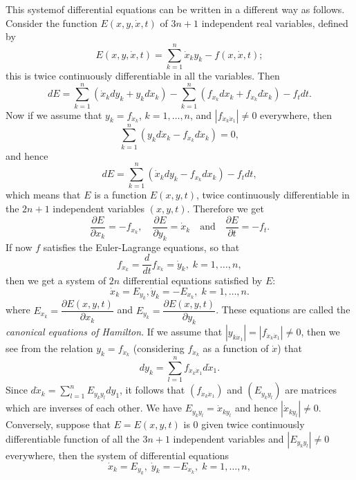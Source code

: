 This system\pageoriginale of differential equations can be written in a different way as follows. Consider the function $E(x, y, \dot{x},t)$ of $3n+1$ independent real variables, defined by
\begin{equation*}
E (x, y, \dot{x}, t) = \sum\limits^n_{k=1} \dot{x}_k y_k - f(x, \dot{x},t); 
\tag{1.1.9}\label{chap1:eq1.1.9}
\end{equation*}
this is twice continuously differentiable in all the variables. Then 
$$
dE = \sum\limits^n_{k=1} (\dot{x}_k dy_k + y_k d\dot{x}_k) - \sum\limits^n_{k=1} (f_{x_k} dx_k +f_{\dot{x}_k} d\dot{x}_k) - f_t dt .
$$
Now if we assume that $y_k = f_{\dot{x}_k}$, $k=1, \ldots, n$, and $|f_{\dot{x}_k \dot{x}_1}| \neq 0$  everywhere, then 
$$
\sum\limits^n_{k=1} (y_k d\dot{x}_k - f_{\dot{x}_k} d\dot{x}_k) = 0,
$$
and hence
$$
dE = \sum\limits^n_{k=1} (\dot{x}_k dy_k - f_{x_k} dx_k) - f_t dt, 
$$
which means that $E$ is a function $E(x,y,t)$, twice continuously differentiable in the $2n+1$ independent variables $(x,y,t)$. Therefore we get
$$
\frac{\partial E}{\partial x_k} = - f_{x_k}, \quad \frac{\partial E}{\partial y_k} = \dot{x}_k \quad \text{and} \quad \frac{\partial E}{\partial t} = - f_t.
$$
If now $f$ satisfies the Euler-Lagrange equations, so that 
$$
f_{x_k} = \frac{d}{dt} f_{\dot{x}_k} = \dot{y}_k, \; k = 1, \ldots, n,
$$
then we get a system of $2n$ differential equations satisfied by $E$:
\begin{equation*}
\dot{x}_k = E_{y_k}, \dot{y}_k = -E_{x_k}, \; k = 1, \ldots, n. \tag{1.1.10}\label{chap1:eq1.1.10}
\end{equation*}\pageoriginale 
where $E_{x_k} = \dfrac{\partial E(x,y,t)}{\partial x_k}$ and $E_{y_k} = \dfrac{\partial E(x,y,t)}{\partial y_k}$. These equations are called the {\em canonical equations of Hamilton}. If we assume that $|y_{k\dot{x}_1}| = |f_{\dot{x}_k \dot{x}_1}| \neq 0$, then we see from the relation $y_k = f_{\dot{x}_k}$ (considering $f_{\dot{x}_k}$ as a function of $\dot{x}$) that 
$$
dy_k = \sum\limits^n_{l=1} f_{\dot{x}_k \dot{x}_1} d\dot{x}_1. 
$$
Since $d\dot{x}_k = \sum\limits^n_{l=1} E_{y_ky_l} dy_1$, it follows that $(f_{\dot{x}_k \dot{x}_1})$ and $(E_{y_ky_l})$ are matrices which are inverses of each other. We have $E_{y_k y_l} = \dot{x}_{ky_l}$ and hence $|\dot{x}_{ky_l}| \neq 0$. Conversely, suppose that $E=E(x,y,t)$ is 0 given twice continuously differentiable function of all the $3n+1$ independent variables and $|E_{y_k y_l}| \neq 0$ everywhere, then the system of differential equations
$$
\dot{x}_k = E_{y_k}, \; \dot{y}_k = - E_{x_k}, \; k = 1, \ldots, n,
$$
